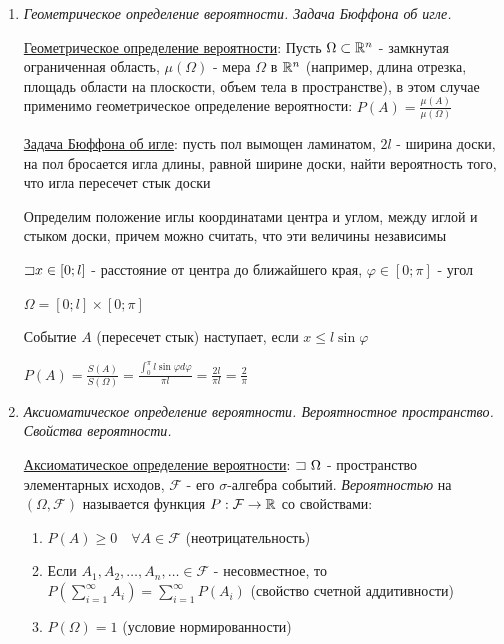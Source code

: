 \documentclass[12pt]{article}
\begin{document}
\begin{enumerate}
    \item \textit{Геометрическое определение вероятности. Задача Бюффона об игле.}

    \hyperlink{geometricdefinitionofprobability}{Геометрическое определение вероятности}: Пусть $\Omega \subset \mathbb{R}^n$ - замкнутая ограниченная область,
    $\mu(\Omega)$ - мера $\Omega$ в $\mathbb{R}^n$ (например, длина отрезка, площадь области на плоскости, объем тела в пространстве), в этом случае применимо геометрическое определение вероятности: $P(A) = \frac{\mu(A)}{\mu(\Omega)}$

    \hyperlink{buffonsproblem}{Задача Бюффона об игле}: пусть пол вымощен ламинатом, $2l$ - ширина доски, на пол бросается игла длины, равной ширине доски,
    найти вероятность того, что игла пересечет стык доски

    Определим положение иглы координатами центра и углом, между иглой и стыком доски, причем можно считать, что эти величины независимы

    $\mathord{\sqsupset} x \in [0; l]$ - расстояние от центра до ближайшего края, $\varphi \in [0; \pi]$ - угол

    $\Omega = [0; l] \times [0; \pi]$

    Событие $A$ (пересечет стык) наступает, если $x \leq l \sin \varphi$

    $P(A) = \frac{S(A)}{S(\Omega)} = \frac{\int_0^\pi l \sin \varphi d \varphi}{\pi l} = \frac{2l}{\pi l} = \frac{2}{\pi}$

    \item \textit{Аксиоматическое определение вероятности. Вероятностное пространство. Свойства вероятности.}

    \hyperlink{axiomaticdefinitionofprobability}{Аксиоматическое определение вероятности}: $\letsymbol\ \Omega$ - пространство элементарных исходов, $\mathcal{F}$ - его $\sigma$-алгебра событий.
    \textit{Вероятностью} на $(\Omega, \mathcal{F})$ называется функция $P: \mathcal{F} \to \mathbb{R}$ со свойствами:

    \begin{enumerate}
        \item $P(A) \geq 0 \quad \forall A \in \mathcal{F}$ (неотрицательность)

        \item Если $A_1, A_2, \dots, A_n, \dots \in \mathcal{F}$ - несовместное, то $P(\sum_{i = 1}^\infty A_i) = \sum_{i = 1}^\infty P(A_i)$ (свойство счетной аддитивности)

        \item $P(\Omega) = 1$ (условие нормированности)
    \end{enumerate}


\end{enumerate}
\end{document}
